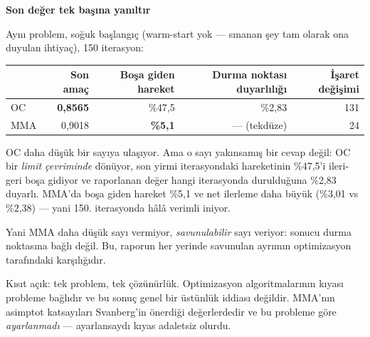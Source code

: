 \documentclass[11pt,a4paper]{article}
\newcommand{\kkkenar}{lacivert}
\newcommand{\kkzemin}{kod}
\newenvironment{renkkutu}[3]{%
  \renewcommand{\kkkenar}{#1}\renewcommand{\kkzemin}{#2}%
  \par\medskip\noindent
  \begin{lrbox}{\kutugovde}%
  \begin{minipage}{\dimexpr\linewidth-2\fboxsep-2\fboxrule\relax}\footnotesize
  \textcolor{#1}{\textbf{#3}}\par\vspace{3pt}%
}{%
  \end{minipage}%
  \end{lrbox}%
  \noindent\fcolorbox{\kkkenar}{\kkzemin}{\usebox{\kutugovde}}%
  \par\medskip
}
\newenvironment{dikkat}[1]{\begin{renkkutu}{orta}{ortabg}{#1}}{\end{renkkutu}}
\begin{document}
\begin{dikkat}{Son değer tek başına yanıltır}
Aynı problem, soğuk başlangıç (warm-start yok --- sınanan şey tam olarak ona
duyulan ihtiyaç), 150 iterasyon:

\begin{center}\footnotesize
\begin{tabular}{@{}lrrrr@{}}
\toprule
 & Son amaç & Boşa giden hareket & Durma noktası duyarlılığı & İşaret değişimi \\
\midrule
OC  & \textbf{0{,}8565} & \%47{,}5 & \%2{,}83 & 131 \\
MMA & 0{,}9018 & \textbf{\%5{,}1} & --- (tekdüze) & 24 \\
\bottomrule
\end{tabular}
\end{center}

OC daha düşük bir sayıya ulaşıyor. Ama o sayı yakınsamış bir cevap değil: OC
bir \emph{limit çevriminde} dönüyor, son yirmi iterasyondaki hareketinin
\%47{,}5'i ileri-geri boşa gidiyor ve raporlanan değer hangi iterasyonda
durulduğuna \%2{,}83 duyarlı. MMA'da boşa giden hareket \%5{,}1 ve net
ilerleme daha büyük (\%3{,}01 vs \%2{,}38) --- yani 150. iterasyonda hâlâ
verimli iniyor.

Yani MMA daha düşük sayı vermiyor, \emph{savunulabilir} sayı veriyor: sonucu
durma noktasına bağlı değil. Bu, raporun her yerinde savunulan ayrımın
optimizasyon tarafındaki karşılığıdır.
\end{dikkat}

\noindent Kısıt açık: tek problem, tek çözünürlük. Optimizasyon
algoritmalarının kıyası probleme bağlıdır ve bu sonuç genel bir üstünlük
iddiası değildir. MMA'nın asimptot katsayıları Svanberg'in önerdiği
değerlerdedir ve bu probleme göre \emph{ayarlanmadı} --- ayarlansaydı kıyas
adaletsiz olurdu.
\end{document}

